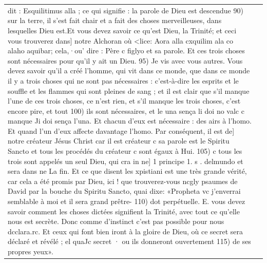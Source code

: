 \begin{longtable}{p{}p{}}
dit : Esquilitimus alla ; ce qui signifie : la parole de Dieu est descendue
90) sur la terre, il s'est fait chair et a fait des choses merveilleuses, dans lesquelles Dieu est.Et vous devez savoir ce qu'est Dieu, la Trinité; et ceci vous trouverez dans] notre Alchoran où <lice: Aora alla cxquilim ala co alaho aquibar; cela,·ou' dire : Père c figlyo et sa parole. Et ces trois choses sont nécessaires pour qu'il y ait un Dieu.
95) Je vis avec vous autres. Vous devez savoir qu'il a créé l'homme, qui vit dans ce monde, que dans ce monde il y a trois choses qui ne sont pas nécessaires : c'est-à-dire les esprits et le souffle et les flammes qui sont pleines de sang ; et il est clair que s'il manque l'une de ces trois choses, ce n'est rien, et s'il manque les trois choses, c'est encore pire, et tout
100) ils sont nécessaires, et le una sença li doi no valc c manque Ji doi sença l'una. Et chacun d'eux est nécessaire : des airs à l'homo. Et quand l'un d'eux affecte davantage l'homo. Par conséquent, il est de] notre créateur Jésus Christ car il est créateur c sa parole est le Spiritu Sancto et tous les procédés du créateur c sont égaux à Hui.
105) c tous les trois sont appelés un seul Dieu, qui cra in ne] 1 principe 1. s .
delmundo et sera dans ne La fin. Et ce que disent les xpistiani est une très grande vérité, car cela a été promis par Dieu, ici ! que trouverez-vous ncgly psaumes de David par la bouche du Spiritu Sancto, quai dixe: «Propheta vc j'enverrai semblable à moi et il sera grand prêtre-
110) dot perpétuelle. E. vous devez savoir comment les choses dictées signifient la Trinité, avec tout ce qu'elle nous est secrète. Donc comme d'instinct c'est pas possible pour nous dcclara.rc. Et ceux qui font bien iront à la gloire de Dieu, où ce secret sera déclaré et révélé ; el quaJc secret · ou ils donneront ouvertement
115) de ses propres yeux». \\


\end{longtable}
